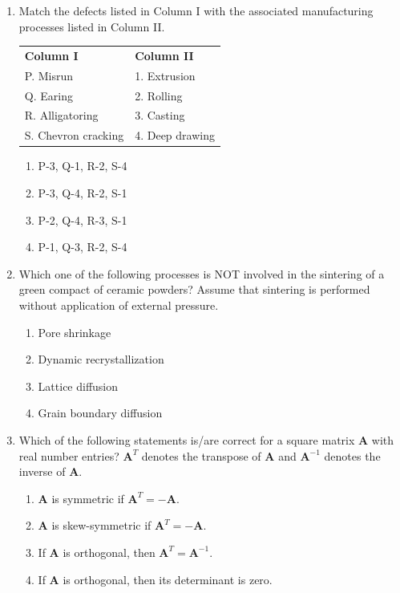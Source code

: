 \documentclass[journal]{IEEEtran}
\theoremstyle{remark}
\begin{document}
\begin{enumerate}[resume]
\item Match the defects listed in Column I with the associated manufacturing processes listed in Column II. \hfill{}
\begin{center}
\begin{tabular}{ll}
\textbf{Column I} & \textbf{Column II} \\
P. Misrun & 1. Extrusion \\
Q. Earing & 2. Rolling \\
R. Alligatoring & 3. Casting \\
S. Chevron cracking & 4. Deep drawing \\
\end{tabular}
\end{center}
\begin{enumerate}
\item P-3, Q-1, R-2, S-4
\item P-3, Q-4, R-2, S-1
\item P-2, Q-4, R-3, S-1
\item P-1, Q-3, R-2, S-4
\end{enumerate}

\item Which one of the following processes is NOT involved in the sintering of a green compact of ceramic powders? Assume that sintering is performed without application of external pressure. \hfill{}
\begin{multicols}{2}
\begin{enumerate}
\item Pore shrinkage
\item Dynamic recrystallization
\item Lattice diffusion
\item Grain boundary diffusion
\end{enumerate}
\end{multicols}

\item Which of the following statements is/are correct for a square matrix $\boldsymbol{A}$ with real number entries? $\boldsymbol{A}^T$ denotes the transpose of $\boldsymbol{A}$ and $\boldsymbol{A}^{-1}$ denotes the inverse of $\boldsymbol{A}$.   \hfill{}
\begin{enumerate}
\item $\boldsymbol{A}$ is symmetric if $\boldsymbol{A}^T = -\boldsymbol{A}$.
\item $\boldsymbol{A}$ is skew-symmetric if $\boldsymbol{A}^T = -\boldsymbol{A}$.
\item If $\boldsymbol{A}$ is orthogonal, then $\boldsymbol{A}^T = \boldsymbol{A}^{-1}$.
\item If $\boldsymbol{A}$ is orthogonal, then its determinant is zero.
\end{enumerate}


\end{enumerate}
\end{document}

